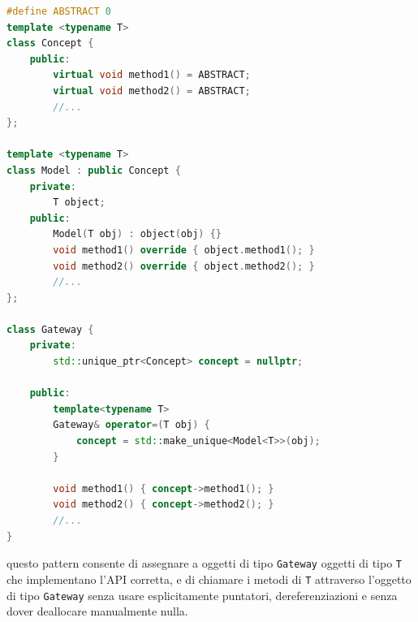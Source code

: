 \vspace{0.5cm}
\begin{lstlisting}[language=C++, frame=single]
#define ABSTRACT 0
template <typename T>
class Concept {
    public:
        virtual void method1() = ABSTRACT;
        virtual void method2() = ABSTRACT;
        //...
};

template <typename T>
class Model : public Concept {
    private:
        T object;
    public:
        Model(T obj) : object(obj) {}
        void method1() override { object.method1(); }
        void method2() override { object.method2(); }
        //...
};

class Gateway {
    private:
        std::unique_ptr<Concept> concept = nullptr;

    public:
        template<typename T>
        Gateway& operator=(T obj) {
            concept = std::make_unique<Model<T>>(obj);
        }

        void method1() { concept->method1(); }
        void method2() { concept->method2(); }
        //...
}

\end{lstlisting}
\vspace{0.5cm}

\newpage

questo pattern consente di assegnare a oggetti di tipo \texttt{Gateway} oggetti di tipo \texttt{T} che implementano
l'API corretta, e di chiamare i metodi di \texttt{T} attraverso l'oggetto di tipo \texttt{Gateway} senza 
usare esplicitamente puntatori, dereferenziazioni e senza dover deallocare manualmente nulla. \\